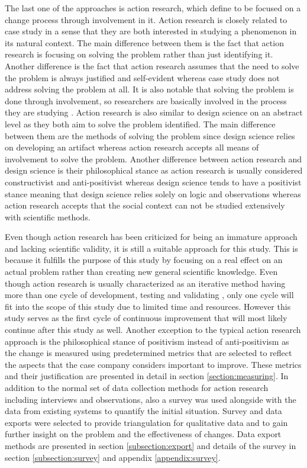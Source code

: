 The last one of the approaches is action research, which \citet{Runeson2009} define to be focused on a change process through involvement in it. Action research is closely
related to case study in a sense that they are both interested in studying a phenomenon in its natural context. The main difference between them is the fact that
action research is focusing on solving the problem rather than just identifying it. Another difference is the fact that action research assumes that the need to
solve the problem is always justified and self-evident
whereas case study does not address solving the problem at all. It is also notable that solving the problem is done through involvement, so researchers are basically
involved in the process they are studying \citep{Easterbrook2008}. Action research is also similar to design science on an abstract level as they both aim to solve the problem
identified. The main difference between them are the methods of solving the problem since design science relies on developing an artifact whereas action research accepts
all means of involvement to solve the problem. Another difference between action research and design science is their philosophical stance as action
research is usually considered constructivist and anti-positivist whereas design science tends to have a positivist stance meaning that design science
relies solely on logic and observations
whereas action research accepts that the social context can not be studied extensively with scientific methods. \citep{Baskerville2009}

Even though action research has been criticized for being an immature approach and lacking scientific validity, it is still a suitable approach for this
study. This is because it fulfills the purpose of this study by focusing on a real effect on an actual problem rather than creating new general scientific knowledge.
Even though action research
is usually characterized as an iterative method having more than one cycle of development, testing and validating \citep{Easterbrook2008}, only one cycle will
fit into the scope of this study due to limited time and resources. However this study serves as the first cycle of continuous improvement that will most likely continue
after this study as well. Another exception to the typical action research approach is the philosophical stance of positivism
instead of anti-positivism \citep{Easterbrook2008} as the change is measured using predetermined
metrics that are selected to reflect the aspects that the case company considers important to improve. These metrics and their justification are
presented in detail in section \ref{section:measuring}. In addition to the normal set of data collection methods for action research including interviews and
observations, also a survey was used alongside with the data from existing systems to quantify the initial situation. Survey and data exports were selected
to provide triangulation for qualitative data and to gain further insight on the problem and the effectiveness of changes. Data export methods are presented in 
section \ref{subsection:export} and details of the survey in section \ref{subsection:survey} and appendix \ref{appendix:survey}.

